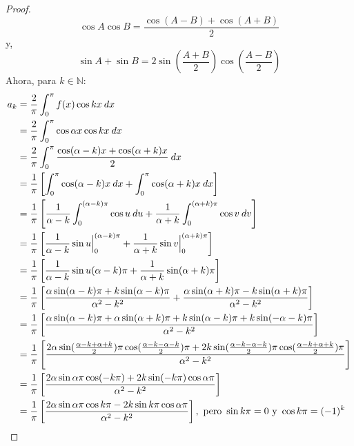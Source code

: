\documentclass[12pt]{report}
\theoremstyle{largebreak}
\begin{document}
\begin{proof}
\begin{equation*}
            \cos A\cos B=\frac{\cos (A-B)+\cos (A+B)}{2}
        \end{equation*}
        y,
        \begin{equation*}
            \sin A+\sin B=2\sin\left(\frac{A+B}{2}\right)\cos\left(\frac{A-B}{2}\right)
        \end{equation*}
        Ahora, para $k\in\mathbb{N}$:
        \begin{equation*}
            \begin{split}
                a_k&=\frac{2}{\pi}\int_{0}^{\pi}f(x)\cos kx\:dx\\
                &=\frac{2}{\pi}\int_{0}^{\pi}\cos\alpha x\cos kx\:dx\\
                &=\frac{2}{\pi}\int_{0}^{\pi}\frac{\cos(\alpha-k)x+\cos(\alpha+k)x}{2}\:dx\\
                &=\frac{1}{\pi}\left[\int_{0}^{\pi}\cos(\alpha-k)x\:dx+\int_{0}^{\pi}\cos(\alpha+k)x\:dx\right]\\
                &=\frac{1}{\pi}\left[\frac{1}{\alpha-k}\int_{0}^{(\alpha-k)\pi}\cos u\:du+\frac{1}{\alpha+k}\int_{0}^{(\alpha+k)\pi}\cos v\:dv\right]\\
                &=\frac{1}{\pi}\left[\frac{1}{\alpha-k}\sin u\Big|_{0}^{(\alpha-k)\pi}+\frac{1}{\alpha+k}\sin v\Big|_{0}^{(\alpha+k)\pi} \right]\\
                &=\frac{1}{\pi}\left[\frac{1}{\alpha-k}\sin u(\alpha-k)\pi+\frac{1}{\alpha+k}\sin (\alpha+k)\pi \right]\\
                &=\frac{1}{\pi}\left[\frac{\alpha\sin(\alpha-k)\pi+k\sin(\alpha-k)\pi}{\alpha^2-k^2}+\frac{\alpha\sin(\alpha+k)\pi-k\sin(\alpha+k)\pi}{\alpha^2-k^2}\right]\\
                &=\frac{1}{\pi}\left[\frac{\alpha\sin(\alpha-k)\pi+\alpha\sin(\alpha+k)\pi+k\sin(\alpha-k)\pi+k\sin(-\alpha-k)\pi}{\alpha^2-k^2}\right]\\
                &=\frac{1}{\pi}\left[\frac{2\alpha\sin(\frac{\alpha-k+\alpha+k}{2})\pi\cos(\frac{\alpha-k-\alpha-k}{2})\pi+2k\sin(\frac{\alpha-k-\alpha-k}{2})\pi\cos(\frac{\alpha-k+\alpha+k}{2})\pi}{\alpha^2-k^2}\right]\\
                &=\frac{1}{\pi}\left[\frac{2\alpha\sin\alpha\pi\cos(-k\pi)+2k\sin(-k\pi)\cos\alpha\pi}{\alpha^2-k^2}\right]\\
                &=\frac{1}{\pi}\left[\frac{2\alpha\sin\alpha\pi\cos k\pi-2k\sin k\pi\cos \alpha\pi}{\alpha^2-k^2}\right],\textup{ pero }\sin k\pi=0\textup{ y }\cos k\pi=(-1)^k \\

\end{split}
\end{equation*}
\end{proof}
\end{document}

